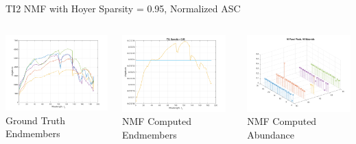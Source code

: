 \documentclass{beamer}
\begin{document}
\begin{frame}{TI2 NMF with Hoyer Sparsity = 0.95, Normalized  ASC}
\begin{columns}
    \begin{column}{0.33\textwidth}
        \includegraphics[width=4cm,center]{reflectance}
        \\ Ground Truth Endmembers
        \centering
    \end{column}
    \begin{column}{0.33\textwidth}
        \includegraphics[width=4cm,center]{nmf_endmembers_ti2_95.png}
        \\ NMF Computed Endmembers
        \centering
    \end{column}
    \begin{column}{0.33\textwidth}
        \includegraphics[width=4cm,center]{nmf_abundance_ti2_95_allmaterials.png}
        \\ NMF Computed Abundance
        \centering
    \end{column}
\end{columns}
\end{frame}
\end{document}
